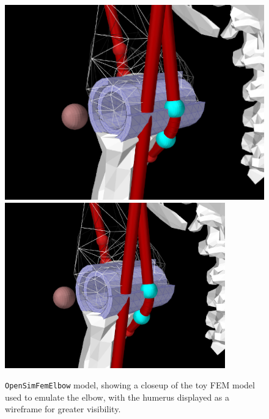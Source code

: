 \begin{figure}[ht]
\begin{center}
   \iflatexml 
      \includegraphics[]{images/OpenSimFemElbow} 
   \else 
      \includegraphics[width=3.75in]{images/OpenSimFemElbow} 
   \fi
\end{center}
\caption{{\tt OpenSimFemElbow} model, showing a closeup of the
toy FEM model used to emulate the elbow, with the humerus displayed as a
wireframe for greater visibility.}
\label{OpenSimFemElbow:fig}
\end{figure}

